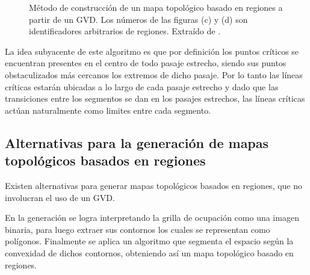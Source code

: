 \begin{figure}[H]
  \caption[Método de construcción de un mapa topológico basado en regiones a partir de un GVD.]{Método de construcción de un mapa topológico basado en regiones a partir de un GVD. Los números de las figuras (c) y (d) son identificadores arbitrarios de regiones. Extraído de \cite{Thrun1998}.}\label{fig:ejThrunTop}
\end{figure}

La idea subyacente de este algoritmo es que por definición los puntos críticos se encuentran presentes en el centro de todo pasaje estrecho, siendo sus puntos obstaculizados más cercanos los extremos de dicho pasaje. Por lo tanto las líneas críticas estarán ubicadas a lo largo de cada pasaje estrecho y dado que las transiciones entre los segmentos se dan en los pasajes estrechos, las líneas críticas actúan naturalmente como limites entre cada segmento.



\subsection[Alternativas para la generación de mapas topológicos basados en regiones]{Alternativas para la generación de mapas topológicos basados en regiones}\label{subsec:mapaTopAlt}

Existen alternativas para generar mapas topológicos basados en regiones, que no
involucran el uso de un GVD.

En \cite{Fermin-Leon2017} la generación se logra interpretando la grilla de
ocupación como una imagen binaria, para luego extraer sus contornos los cuales
se representan como polígonos. Finalmente se aplica un algoritmo que segmenta
el espacio según la convexidad de dichos contornos, obteniendo así un mapa
topológico basado en regiones.

